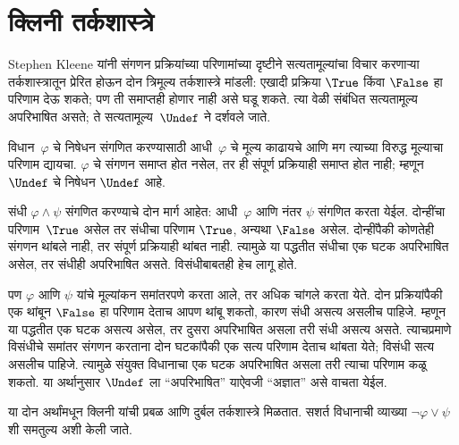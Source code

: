 \section{क्लिनी तर्कशास्त्रे}\label{mvl:thr:skl:sec}

Stephen Kleene यांनी संगणन प्रक्रियांच्या परिणामांच्या दृष्टीने
सत्यतामूल्यांचा विचार करणाऱ्या तर्कशास्त्रातून प्रेरित होऊन दोन
त्रिमूल्य तर्कशास्त्रे मांडली: एखादी प्रक्रिया $\True$ किंवा
$\False$ हा परिणाम देऊ शकते; पण ती समाप्तही होणार नाही असे
घडू शकते. त्या वेळी संबंधित सत्यतामूल्य अपरिभाषित असते;
ते सत्यतामूल्य~$\Undef$ ने दर्शवले जाते.

विधान~$\varphi$ चे निषेधन संगणित करण्यासाठी आधी~$\varphi$ चे मूल्य
काढायचे आणि मग त्याच्या विरुद्ध मूल्याचा परिणाम द्यायचा.
$\varphi$ चे संगणन समाप्त होत नसेल, तर ही संपूर्ण प्रक्रियाही
समाप्त होत नाही; म्हणून $\Undef$ चे निषेधन $\Undef$ आहे.

संधी $\varphi \land \psi$ संगणित करण्याचे दोन मार्ग आहेत: आधी~$\varphi$
आणि नंतर $\psi$ संगणित करता येईल. दोन्हींचा परिणाम~$\True$
असेल तर संधीचा परिणाम $\True$, अन्यथा $\False$ असेल.
दोन्हींपैकी कोणतेही संगणन थांबले नाही, तर संपूर्ण प्रक्रियाही
थांबत नाही. त्यामुळे या पद्धतीत संधीचा एक घटक अपरिभाषित
असेल, तर संधीही अपरिभाषित असते. विसंधीबाबतही हेच लागू होते.

पण $\varphi$ आणि $\psi$ यांचे मूल्यांकन समांतरपणे करता आले, तर
अधिक चांगले करता येते. दोन प्रक्रियांपैकी एक थांबून $\False$
हा परिणाम देताच आपण थांबू शकतो, कारण संधी असत्य असलीच
पाहिजे. म्हणून या पद्धतीत एक घटक असत्य असेल, तर दुसरा
अपरिभाषित असला तरी संधी असत्य असते. त्याचप्रमाणे विसंधीचे
समांतर संगणन करताना दोन घटकांपैकी एक सत्य परिणाम देताच
थांबता येते; विसंधी सत्य असलीच पाहिजे. त्यामुळे संयुक्त
विधानाचा एक घटक अपरिभाषित असला तरी त्याचा परिणाम कळू
शकतो. या अर्थानुसार $\Undef$ ला ``अपरिभाषित'' याऐवजी
``अज्ञात'' असे वाचता येईल.

या दोन अर्थांमधून क्लिनी यांची प्रबळ आणि दुर्बल तर्कशास्त्रे
मिळतात. सशर्त विधानाची व्याख्या $\lnot \varphi \lor \psi$ शी
समतुल्य अशी केली जाते.

